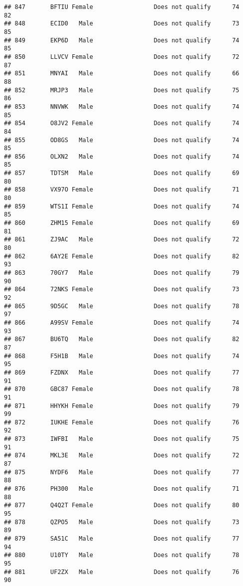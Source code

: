 \documentclass[
]{article}
\begin{document}
\begin{verbatim}
## 847       BFTIU Female                 Does not qualify      74       82
## 848       ECID0   Male                 Does not qualify      73       85
## 849       EKP6D   Male                 Does not qualify      74       85
## 850       LLVCV Female                 Does not qualify      72       87
## 851       MNYAI   Male                 Does not qualify      66       88
## 852       MRJP3   Male                 Does not qualify      75       86
## 853       NNVWK   Male                 Does not qualify      74       85
## 854       O8JV2 Female                 Does not qualify      74       84
## 855       OD8GS   Male                 Does not qualify      74       85
## 856       OLXN2   Male                 Does not qualify      74       85
## 857       TDTSM   Male                 Does not qualify      69       80
## 858       VX97O Female                 Does not qualify      71       80
## 859       WTS1I Female                 Does not qualify      74       85
## 860       ZHM15 Female                 Does not qualify      69       81
## 861       ZJ9AC   Male                 Does not qualify      72       80
## 862       6AY2E Female                 Does not qualify      82       93
## 863       70GY7   Male                 Does not qualify      79       90
## 864       72NKS Female                 Does not qualify      73       92
## 865       9D5GC   Male                 Does not qualify      78       97
## 866       A99SV Female                 Does not qualify      74       93
## 867       BU6TQ   Male                 Does not qualify      82       87
## 868       F5H1B   Male                 Does not qualify      74       95
## 869       FZDNX   Male                 Does not qualify      77       91
## 870       GBC87 Female                 Does not qualify      78       91
## 871       HHYKH Female                 Does not qualify      79       99
## 872       IUKHE Female                 Does not qualify      76       92
## 873       IWFBI   Male                 Does not qualify      75       91
## 874       MKL3E   Male                 Does not qualify      72       87
## 875       NYDF6   Male                 Does not qualify      77       88
## 876       PH300   Male                 Does not qualify      71       88
## 877       Q4Q2T Female                 Does not qualify      80       95
## 878       QZPO5   Male                 Does not qualify      73       89
## 879       SA51C   Male                 Does not qualify      77       94
## 880       U10TY   Male                 Does not qualify      78       95
## 881       UF2ZX   Male                 Does not qualify      76       90

\end{verbatim}
\end{document}
